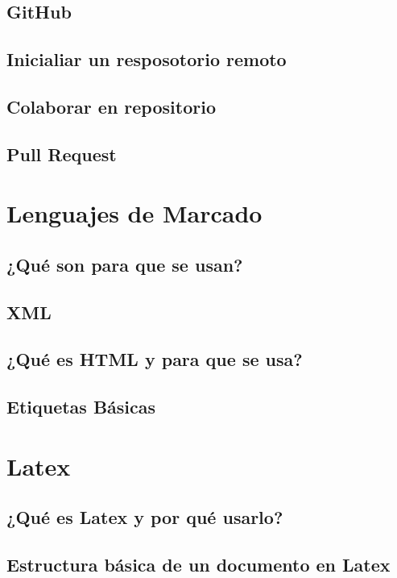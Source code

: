 \documentclass[11pt,letterpaper]{article}
\begin{document}
\subsection{GitHub}
\subsection{Inicialiar un resposotorio remoto}
\subsection{Colaborar en repositorio}
\subsection{Pull Request}
\section{Lenguajes de Marcado}
\subsection{¿Qué son para que se usan?}
\subsection{XML}
\subsection{¿Qué es HTML y para que se usa?}
\subsection{Etiquetas Básicas}
\section{Latex}
\subsection{¿Qué es Latex y por qué usarlo?}
\subsection{Estructura básica de un documento en Latex}
\end{document}
